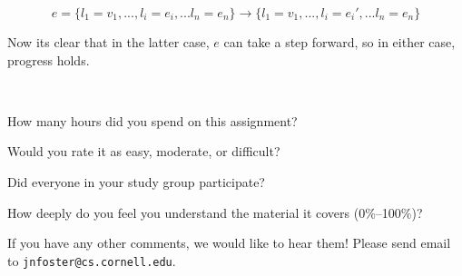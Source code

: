 \documentclass[10pt]{article}
\begin{document}
\begin{exercise}
\begin{enumerate}[\hspace{20pt}]
$$e= \{l_1 = v_1, ... , l_i = e_i, ... l_n = e_n \} \rightarrow \{l_1 = v_1, ... , 
l_i = e_i', ... l_n = e_n \}$$

Now its clear that in the latter case, $e$ can take a step forward, so in either 
case, progress holds. 
\checkmark \checkmark
\end{enumerate}

\end{exercise}

\begin{debriefing} \hfill\\[-4ex]
\begin{enumerate*}
\item How many hours did you spend on this assignment? 
\item Would you rate it as easy, moderate, or difficult? 
\item Did everyone in your study group participate? 
\item How deeply do you feel you understand the material it covers (0\%--100\%)? 
\item If you have any other comments, we would like to hear them!
  Please send email to \texttt{jnfoster@cs.cornell.edu}.
\end{enumerate*}
\end{debriefing}
\end{document}
